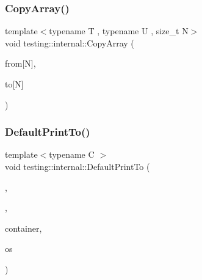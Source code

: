 \subsubsection{\texorpdfstring{CopyArray()}{CopyArray()}\hspace{0.1cm}{\footnotesize\ttfamily [3/3]}}
{\footnotesize\ttfamily template$<$typename T , typename U , size\+\_\+t N$>$ \\
void testing\+::internal\+::\+Copy\+Array (\begin{DoxyParamCaption}\item[{const T(\&)}]{from\mbox{[}\+N\mbox{]},  }\item[{U($\ast$)}]{to\mbox{[}\+N\mbox{]} }\end{DoxyParamCaption})\hspace{0.3cm}{\ttfamily [inline]}}

\mbox{\label{namespacetesting_1_1internal_ac7dfe02c4c1cbfe89c23a93d873079c5}} 
\subsubsection{\texorpdfstring{DefaultPrintTo()}{DefaultPrintTo()}\hspace{0.1cm}{\footnotesize\ttfamily [1/3]}}
{\footnotesize\ttfamily template$<$typename C $>$ \\
void testing\+::internal\+::\+Default\+Print\+To (\begin{DoxyParamCaption}\item[{\mbox{\hyperlink{namespacetesting_1_1internal_ad8f0c2883245f1df2a53618a49f0deb3}{Is\+Container}}}]{,  }\item[{\mbox{\hyperlink{namespacetesting_1_1internal_abb1d0789f19bdde21affccbd1078b525}{false\+\_\+type}}}]{,  }\item[{const C \&}]{container,  }\item[{\+::std\+::ostream $\ast$}]{os }\end{DoxyParamCaption})}

\mbox{\label{namespacetesting_1_1internal_affa1f94e3ba8db8b964553c2871bf339}} 
